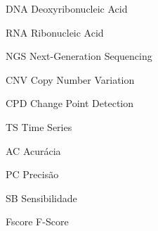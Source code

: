 
\begin{siglas}
    \item[DNA] Deoxyribonucleic Acid
    \item[RNA] Ribonucleic Acid
    \item[NGS] Next-Generation Sequencing
    \item[CNV] Copy Number Variation
    \item[CPD] Change Point Detection
    \item[TS] Time Series
    \item[AC] Acurácia
    \item[PC] Precisão
    \item[SB] Sensibilidade
    \item[Fscore] F-Score
\end{siglas}

